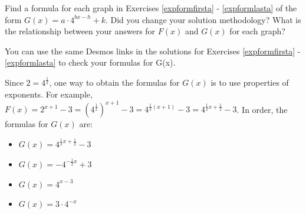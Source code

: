 \documentclass{ximera}
\begin{document}
\begin{problem}
Find a formula for each graph in Exercises \ref{expformfirsta} - \ref{expformlasta} of the form $G(x) = a \cdot 4^{bx-h} + k$.
  Did you change your solution methodology?    What is the relationship between your answers for $F(x)$ and $G(x)$ for each graph? 

\begin{solution}
You can use the same Desmos links in the solutions for Exercises \ref{expformfirsta} - \ref{expformlasta} to check your formulas for G(x).

Since $2 = 4^{\frac{1}{2}}$, one way to obtain the formulas for $G(x)$ is to use properties of exponents.  For example, $F(x) = 2^{x+1}-3 = \left(4^{\frac{1}{2}}\right)^{x+1} -3 = 4^{\frac{1}{2}(x+1)} - 3 = 4^{\frac{1}{2} x + \frac{1}{2}} - 3$.  In order, the formulas for $G(x)$ are:


\begin{itemize}

\item $G(x) = 4^{\frac{1}{2}x+\frac{1}{2}}-3$

\item  $G(x) = -4^{-\frac{1}{2} x} + 3$

\item $G(x) = 4^{x-3}$

\item  $G(x) =3 \cdot 4^{-x}$

\end{itemize}

\end{solution}
\end{problem}
\end{document}
